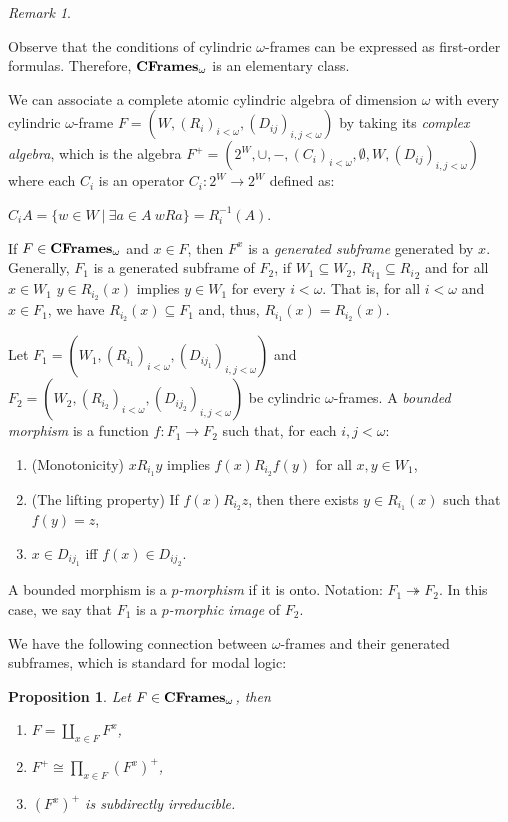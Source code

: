 \documentclass{article}
\theoremstyle{defin}
\theoremstyle{theorem}
\theoremstyle{claim}
\theoremstyle{prop}
\newtheorem{prop}{Proposition}
\theoremstyle{lemma}
\theoremstyle{fact}
\theoremstyle{remark}
\newtheorem{remark}{Remark}
\theoremstyle{ex}
\theoremstyle{col}
\theoremstyle{question}
\begin{document}
\begin{remark}

$ $

Observe that the conditions of cylindric $\omega$-frames can be expressed as first-order formulas. 
Therefore, ${\bf CFrames}_{\omega}$ is an elementary class.
\end{remark}

We can associate a complete atomic cylindric algebra of dimension $\omega$ with every cylindric $\omega$-frame 
$F = (W, {(R_i)}_{i < \omega}, {(D_{ij})}_{i, j < \omega})$ by taking its \emph{complex algebra}, 
which is the algebra $F^{+} = (2^{W}, \cup, -, {(C_i)}_{i < \omega}, \emptyset, W, {(D_{ij})}_{i, j < \omega})$ 
where each $C_i$ is an operator $C_i : 2^W \to 2^W$ defined as:
\begin{center}
$C_i A = \{ w \in W \: | \: \exists a \in A \: w R a \} = R_i^{-1}(A)$.
\end{center}

If $F \in {\bf CFrames}_{\omega}$ and $x \in F$, then $F^{x}$ is a \emph{generated subframe} generated by $x$. 
Generally, $F_1$ is a generated subframe of $F_2$, if $W_1 \subseteq W_2$, ${R_i}_1 \subseteq {R_i}_2$ 
and for all $x \in W_1$ $y \in R_{i_2}(x)$ implies $y \in W_1$ for every $i < \omega$. 
That is, for all $i < \omega$ and $x \in F_1$, we have $R_{i_2}(x) \subseteq F_1$ and, thus, 
$R_{i_1}(x) = R_{i_2}(x)$.

Let $F_1 = (W_1, {(R_{i_1})}_{i < \omega}, {(D_{{ij}_1})}_{i, j < \omega})$ and $F_2 = (W_2, {(R_{i_2})}_{i < \omega}, {(D_{ij_2})}_{i, j < \omega})$ be cylindric $\omega$-frames. 
A \emph{bounded morphism} is a function $f : F_1 \to F_2$ such that, for each $i, j < \omega$:
\begin{enumerate}
\item (Monotonicity) $x R_{i_1} y$ implies $f(x) R_{i_2} f(y)$ for all $x, y \in W_1$,
\item (The lifting property) If $f(x) R_{i_2} z$, then there exists $y \in R_{i_1}(x)$ such that $f(y) = z$,
\item $x \in D_{{ij}_1}$ iff $f(x) \in D_{{ij}_2}$.
\end{enumerate}
A bounded morphism is a \emph{$p$-morphism} if it is onto. Notation: $F_1 \twoheadrightarrow F_2$. 
In this case, we say that $F_1$ is a \emph{$p$-morphic image} of $F_2$. 

We have the following connection between $\omega$-frames and their generated subframes, which is standard for modal logic:
\begin{prop}
Let $F \in {\bf CFrames}_{\omega}$, then
\begin{enumerate}
\item $F = \coprod \limits_{x \in F} F^{x}$,
\item $F^+ \cong \prod \limits_{x \in F} {(F^{x})}^+$,
\item ${(F^{x})}^+$ is subdirectly irreducible.
\end{enumerate}
\end{prop}
\end{document}
